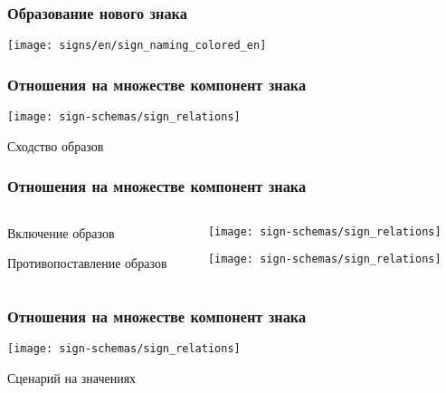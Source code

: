 \documentclass[default]{beamer}
\begin{document}
	\begin{frame}
		\frametitle{Образование нового знака}
		\centering
		\texttt{[image: signs/en/sign\_naming\_colored\_en]}
	\end{frame}		
	
	\begin{frame}
		\frametitle{Отношения на множестве компонент знака}
		\centering
		\texttt{[image: sign-schemas/sign\_relations]}
		
		Сходство образов
	\end{frame}	
	
	\begin{frame}
		\frametitle{Отношения на множестве компонент знака}
		
		\begin{columns}
			\begin{column}{0.3\textwidth}
				\centering
				Включение образов 
				\par\bigskip
				\par\bigskip
				\par\bigskip
				\par\bigskip
				\par\bigskip
				Противопоставление образов 
				
			\end{column}
			\begin{column}{0.7\textwidth}
				\texttt{[image: sign-schemas/sign\_relations]}
				
				\texttt{[image: sign-schemas/sign\_relations]}
			\end{column}
		\end{columns}
		
	\end{frame}	
	
	\begin{frame}
		\frametitle{Отношения на множестве компонент знака}
		\centering
		\texttt{[image: sign-schemas/sign\_relations]}
		
		Сценарий на значениях
	\end{frame}	
	
\end{document}
